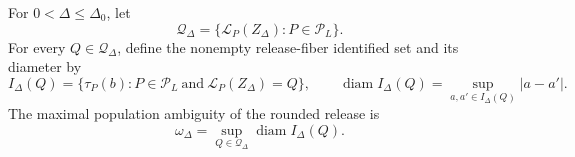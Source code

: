For \(0<\Delta\leq\Delta_0\), let
\[
 \mathcal Q_\Delta=\{\mathcal L_P(Z_\Delta):P\in\mathcal P_L\}.
\]
For every \(Q\in\mathcal Q_\Delta\), define the nonempty release-fiber identified set and its diameter by
\[
 I_\Delta(Q)=\{\tau_P(b):P\in\mathcal P_L\ \text{and}\ \mathcal L_P(Z_\Delta)=Q\},
 \qquad
 \operatorname{diam} I_\Delta(Q)=\sup_{a,a'\in I_\Delta(Q)}|a-a'|.
\]
The maximal population ambiguity of the rounded release is
\[
 \omega_\Delta=\sup_{Q\in\mathcal Q_\Delta}\operatorname{diam} I_\Delta(Q).
\]